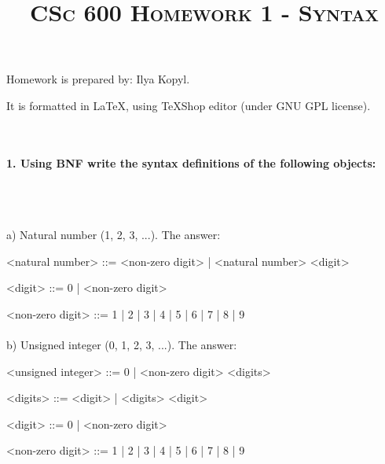 \documentclass{article}
\begin{document}
	\setlength{\grammarparsep}{5pt plus 1pt minus 1pt} %
	\setlength{\grammarindent}{12em} %

	\title{\textsc{CSc 600 Homework 1 - Syntax}}

	\maketitle

		Homework is prepared by: Ilya Kopyl.

		It is formatted in LaTeX, using TeXShop editor (under GNU GPL license).

	\rmfamily\




	\paragraph{1. Using BNF write the syntax definitions of the following objects:}\
	\rmfamily\\\
	
			a) Natural number (1, 2, 3, ...). The answer:
	\ttfamily
	\begin{grammar}
	
		<natural number> ::= <non-zero digit> | <natural number> <digit>

		<digit> ::= 0 | <non-zero digit>

		<non-zero digit> ::= 1 | 2 | 3 | 4 | 5 | 6 | 7 | 8 | 9
		
	\end{grammar}
	
	

	
	\paragraph{}
	\rmfamily
	
			b) Unsigned integer (0, 1, 2, 3, ...). The answer:
	\ttfamily
	\begin{grammar}
		
		<unsigned integer> ::= 0 | <non-zero digit> <digits>
		
		<digits> ::= <digit> | <digits> <digit>

		<digit> ::= 0 | <non-zero digit>

		<non-zero digit> ::= 1 | 2 | 3 | 4 | 5 | 6 | 7 | 8 | 9
		
	\end{grammar}
\end{document}

